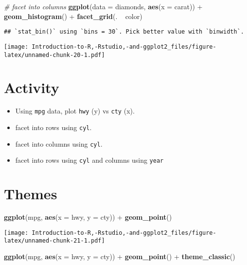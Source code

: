 \documentclass[]{book}
\newenvironment{Shaded}{\begin{snugshade}}{\end{snugshade}}
\newcommand{\KeywordTok}[1]{\textcolor[rgb]{0.13,0.29,0.53}{\textbf{{#1}}}}
\newcommand{\DataTypeTok}[1]{\textcolor[rgb]{0.13,0.29,0.53}{{#1}}}
\newcommand{\StringTok}[1]{\textcolor[rgb]{0.31,0.60,0.02}{{#1}}}
\newcommand{\CommentTok}[1]{\textcolor[rgb]{0.56,0.35,0.01}{\textit{{#1}}}}
\newcommand{\NormalTok}[1]{{#1}}
\begin{document}
\begin{Shaded}
\begin{Highlighting}[]
\CommentTok{# facet into columns}
\KeywordTok{ggplot}\NormalTok{(}\DataTypeTok{data =} \NormalTok{diamonds, }\KeywordTok{aes}\NormalTok{(}\DataTypeTok{x =} \NormalTok{carat)) +}\StringTok{ }\KeywordTok{geom_histogram}\NormalTok{() +}\StringTok{ }\KeywordTok{facet_grid}\NormalTok{(. ~}\StringTok{ }\NormalTok{color)}
\end{Highlighting}
\end{Shaded}

\begin{verbatim}
## `stat_bin()` using `bins = 30`. Pick better value with `binwidth`.
\end{verbatim}

\texttt{[image: Introduction-to-R,-Rstudio,-and-ggplot2\_files/figure-latex/unnamed-chunk-20-1.pdf]}

\section{Activity}\label{activity-2}

\begin{itemize}
\item
  Using \texttt{mpg} data, plot \texttt{hwy} (y) vs \texttt{cty} (x).
\item
  facet into rows using \texttt{cyl}.
\item
  facet into columns using \texttt{cyl}.
\item
  facet into rows using \texttt{cyl} and columns using \texttt{year}
\end{itemize}

\section{Themes}\label{themes}

\begin{Shaded}
\begin{Highlighting}[]
\KeywordTok{ggplot}\NormalTok{(mpg, }\KeywordTok{aes}\NormalTok{(}\DataTypeTok{x =} \NormalTok{hwy, }\DataTypeTok{y =} \NormalTok{cty)) +}\StringTok{ }\KeywordTok{geom_point}\NormalTok{() }
\end{Highlighting}
\end{Shaded}

\texttt{[image: Introduction-to-R,-Rstudio,-and-ggplot2\_files/figure-latex/unnamed-chunk-21-1.pdf]}

\begin{Shaded}
\begin{Highlighting}[]
\KeywordTok{ggplot}\NormalTok{(mpg, }\KeywordTok{aes}\NormalTok{(}\DataTypeTok{x =} \NormalTok{hwy, }\DataTypeTok{y =} \NormalTok{cty)) +}\StringTok{ }\KeywordTok{geom_point}\NormalTok{() +}\StringTok{ }\KeywordTok{theme_classic}\NormalTok{()}
\end{Highlighting}
\end{Shaded}
\end{document}
